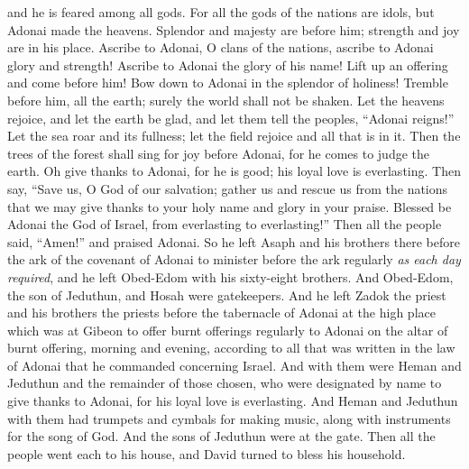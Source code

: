 \begin{biblechapter}
and he is feared among all gods.
\verse For all the gods of the nations are idols, 
but Adonai made the heavens.
\verse Splendor and majesty are before him; 
strength and joy are in his place.
\verse Ascribe to Adonai, O clans of the nations, 
ascribe to Adonai glory and strength!
\verse Ascribe to Adonai the glory of his name! 
Lift up an offering and come before him! 
Bow down to Adonai in the splendor of holiness!
\verse Tremble before him, all the earth; 
surely the world shall not be shaken.
\verse Let the heavens rejoice, and let the earth be glad, 
and let them tell the peoples, “Adonai reigns!”
\verse Let the sea roar and its fullness; 
let the field rejoice and all that is in it.
\verse Then the trees of the forest shall sing for joy before Adonai, 
for he comes to judge the earth.
\verse Oh give thanks to Adonai, for he is good; 
his loyal love is everlasting.
\verse Then say, “Save us, O God of our salvation; 
gather us and rescue us from the nations 
that we may give thanks to your holy name 
and glory in your praise.
\verse Blessed be Adonai the God of Israel, 
from everlasting to everlasting!” Then all the people said, “Amen!” and praised Adonai.
 So he left Asaph and his brothers there before the ark of the covenant of Adonai to minister before the ark regularly \textit{as each day required},
\verse and he left Obed-Edom with his sixty-eight brothers. And Obed-Edom, the son of Jeduthun, and Hosah were gatekeepers.
\verse And he left Zadok the priest and his brothers the priests before the tabernacle of Adonai at the high place which was at Gibeon
\verse to offer burnt offerings regularly to Adonai on the altar of burnt offering, morning and evening, according to all that was written in the law of Adonai that he commanded concerning Israel.
\verse And with them were Heman and Jeduthun and the remainder of those chosen, who were designated by name to give thanks to Adonai, for his loyal love is everlasting.
\verse And Heman and Jeduthun with them had trumpets and cymbals for making music, along with instruments for the song of God. And the sons of Jeduthun were at the gate.
\verse Then all the people went each to his house, and David turned to bless his household.
\end{biblechapter}

